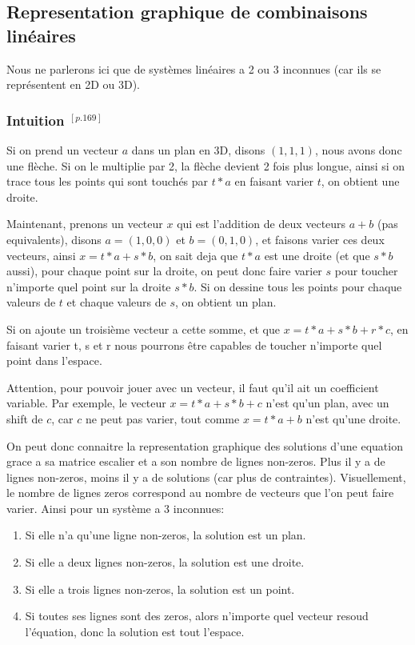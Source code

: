 \documentclass[12pt]{article}
\begin{document}
 
\subsection{Representation graphique de combinaisons linéaires}

Nous ne parlerons ici que de systèmes linéaires a 2 ou 3 inconnues (car ils se représentent en 2D ou 3D). 

\subsubsection{Intuition $^{[p.169]}$}
  
Si on prend un vecteur $a$ dans un plan en 3D, disons $(1,1,1)$, nous avons donc une flèche. Si on le multiplie par 2, la flèche devient 2 fois plus longue, ainsi si on trace tous les points qui sont touchés par $t*a$ en faisant varier  $t$, on obtient une droite.

Maintenant, prenons un vecteur $x$ qui est l'addition de deux vecteurs $a+b$ (pas equivalents), disons $a=(1,0,0)$ et $b=(0,1,0)$, et faisons varier ces deux vecteurs, ainsi $x= t*a + s*b$, on sait deja que $t*a$ est une droite (et que $s*b$ aussi), pour chaque point sur la droite, on peut donc faire varier $s$ pour toucher n'importe quel point sur la droite $s*b$. Si on dessine tous les points pour chaque valeurs de $t$ et chaque valeurs de $s$, on obtient un plan.

Si on ajoute un troisième vecteur a cette somme, et que $x = t*a + s*b + r*c$, en faisant varier t, s et r nous pourrons être capables de toucher n'importe quel point dans l'espace.  

Attention, pour pouvoir jouer avec un vecteur, il faut qu'il ait un coefficient variable. Par exemple, le vecteur $x = t*a + s*b + c$ n'est qu'un plan, avec un shift de $c$, car  $c$ ne peut pas varier, tout comme $x = t*a + b$ n'est qu'une droite.

On peut donc connaitre la representation graphique des solutions d'une equation grace a sa matrice escalier et a son nombre de lignes non-zeros. Plus il y a de lignes non-zeros, moins il y a de solutions (car plus de contraintes). Visuellement, le nombre de lignes zeros correspond au nombre de vecteurs que l'on peut faire varier. Ainsi pour un système a 3 inconnues:
\begin{enumerate}
  \item Si elle n'a qu'une ligne non-zeros, la solution est un plan.
  \item  Si elle a deux lignes non-zeros, la solution est une droite.
  \item Si elle a trois lignes non-zeros, la solution est un point.
    \item Si toutes ses lignes sont des zeros, alors n'importe quel vecteur resoud l'équation, donc la solution est tout l'espace.
\end{enumerate}
\end{document}
